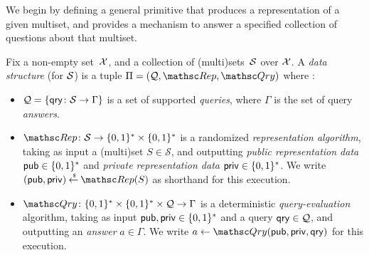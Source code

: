   We begin by defining a general primitive
that produces a representation of a given multiset, and provides a
mechanism to answer a specified collection of questions about that
multiset. 
\begin{definition} \rm
Fix a non-empty set~${\cal X}$, and a collection of (multi)sets~${\cal S}$
over ${\cal X}$. A \emph{data structure} (for ${\cal S}$) is a tuple
$\setprim=(\calQ,\Rep, \Qry)$ where :
\begin{itemize}
\item $\mathcal{Q}=\{\mathsf{qry} \colon \mathcal{S} \to \Gamma\}$ is a set
    of supported \emph{queries}, where $\Gamma$ is the set of query \emph{answers}.
\item $\Rep \colon \mathcal{S} \to \bits^*
    \times \bits^*$ is a randomized \emph{representation
    algorithm}, taking as input a (multi)set $S \in \mathcal{S}$, and outputting %
    \emph{public representation data} ${\sf pub} \in \{0,1\}^*$ and
    \emph{private representation data} ${\sf priv} \in \{0,1\}^*$. We write
    $(\pubaux,\privaux) \getsr \Rep(S)$ as shorthand for this execution.
\item $\Qry\colon \bits^* \times \bits^* \times \calQ \to
    \Gamma$ is a deterministic \emph{query-evaluation}
    algorithm, taking as input ${\sf pub},{\sf priv} \in \{0,1\}^*$
    and a query $\mathsf{qry} \in {\cal Q}$, and outputting an \emph{answer}
    $a \in \Gamma$.  We write $a \gets \Qry(\pubaux,\privaux,\qry)$
    for this execution.
\end{itemize}
\hfill\dqed
\end{definition}



